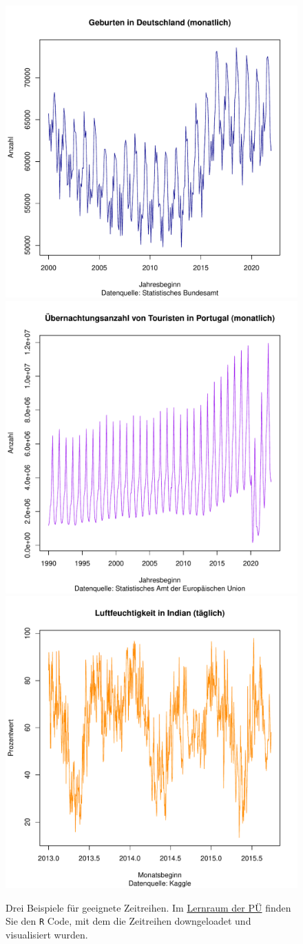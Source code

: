 \enlargethispage{3cm}
\vspace{-0.5cm}
\begin{figure}[!h]
    \centering
    \includegraphics[width = .3\textwidth]{resources/geburten.pdf}
    \includegraphics[width = .3\textwidth]{resources/uebernachtungen.pdf}
    \includegraphics[width = .3\textwidth]{resources/luftfeuchtigkeit.pdf}
    \caption{Drei Beispiele für geeignete Zeitreihen. Im \href{https://moodle.uni-bielefeld.de/course/view.php?id=1035}{Lernraum der PÜ} finden Sie den \texttt{R} Code, mit dem die Zeitreihen downgeloadet und visualisiert wurden.}
    \label{fig:zeitreihe_beispiele}
\end{figure}
\fi


